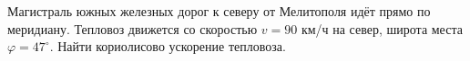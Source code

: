 Магистраль южных железных дорог к северу от Мелитополя идёт прямо по
меридиану. Тепловоз движется со скоростью $v=90$ км/ч на север, широта
места $\varphi=47^\circ$. Найти кориолисово ускорение тепловоза.
